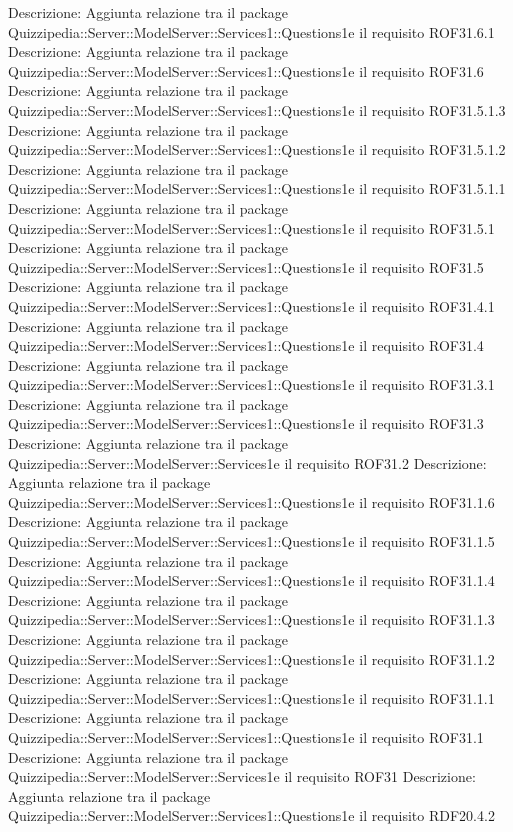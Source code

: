 Descrizione: Aggiunta relazione tra il package Quizzipedia::Server::ModelServer::Services1::Questions1e il requisito ROF31.6.1 
Descrizione: Aggiunta relazione tra il package Quizzipedia::Server::ModelServer::Services1::Questions1e il requisito ROF31.6 
Descrizione: Aggiunta relazione tra il package Quizzipedia::Server::ModelServer::Services1::Questions1e il requisito ROF31.5.1.3 
Descrizione: Aggiunta relazione tra il package Quizzipedia::Server::ModelServer::Services1::Questions1e il requisito ROF31.5.1.2 
Descrizione: Aggiunta relazione tra il package Quizzipedia::Server::ModelServer::Services1::Questions1e il requisito ROF31.5.1.1 
Descrizione: Aggiunta relazione tra il package Quizzipedia::Server::ModelServer::Services1::Questions1e il requisito ROF31.5.1 
Descrizione: Aggiunta relazione tra il package Quizzipedia::Server::ModelServer::Services1::Questions1e il requisito ROF31.5 
Descrizione: Aggiunta relazione tra il package Quizzipedia::Server::ModelServer::Services1::Questions1e il requisito ROF31.4.1 
Descrizione: Aggiunta relazione tra il package Quizzipedia::Server::ModelServer::Services1::Questions1e il requisito ROF31.4 
Descrizione: Aggiunta relazione tra il package Quizzipedia::Server::ModelServer::Services1::Questions1e il requisito ROF31.3.1 
Descrizione: Aggiunta relazione tra il package Quizzipedia::Server::ModelServer::Services1::Questions1e il requisito ROF31.3 
Descrizione: Aggiunta relazione tra il package Quizzipedia::Server::ModelServer::Services1e il requisito ROF31.2 
Descrizione: Aggiunta relazione tra il package Quizzipedia::Server::ModelServer::Services1::Questions1e il requisito ROF31.1.6 
Descrizione: Aggiunta relazione tra il package Quizzipedia::Server::ModelServer::Services1::Questions1e il requisito ROF31.1.5 
Descrizione: Aggiunta relazione tra il package Quizzipedia::Server::ModelServer::Services1::Questions1e il requisito ROF31.1.4 
Descrizione: Aggiunta relazione tra il package Quizzipedia::Server::ModelServer::Services1::Questions1e il requisito ROF31.1.3 
Descrizione: Aggiunta relazione tra il package Quizzipedia::Server::ModelServer::Services1::Questions1e il requisito ROF31.1.2 
Descrizione: Aggiunta relazione tra il package Quizzipedia::Server::ModelServer::Services1::Questions1e il requisito ROF31.1.1 
Descrizione: Aggiunta relazione tra il package Quizzipedia::Server::ModelServer::Services1::Questions1e il requisito ROF31.1 
Descrizione: Aggiunta relazione tra il package Quizzipedia::Server::ModelServer::Services1e il requisito ROF31 
Descrizione: Aggiunta relazione tra il package Quizzipedia::Server::ModelServer::Services1::Questions1e il requisito RDF20.4.2 

